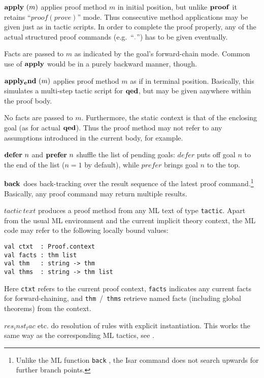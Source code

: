 \begin{descr}
\item [${\mathord{\mathbf{apply}}}~(m)$] applies proof method $m$ in initial
  position, but unlike ${\mathord{\mathbf{proof}}}$ it retains ``$proof(prove)$'' mode.  Thus
  consecutive method applications may be given just as in tactic scripts.  In
  order to complete the proof properly, any of the actual structured proof
  commands (e.g.\ ``${\mathord{\mathbf{.}}}$'') has to be given eventually.
  
  Facts are passed to $m$ as indicated by the goal's forward-chain mode.
  Common use of ${\mathord{\mathbf{apply}}}$ would be in a purely backward manner,
  though.
\item [${\mathord{\mathbf{apply_end}}}~(m)$] applies proof method $m$ as if in
  terminal position.  Basically, this simulates a multi-step tactic script for
  ${\mathord{\mathbf{qed}}}$, but may be given anywhere within the proof body.
  
  No facts are passed to $m$.  Furthermore, the static context is that of the
  enclosing goal (as for actual ${\mathord{\mathbf{qed}}}$).  Thus the proof method may not
  refer to any assumptions introduced in the current body, for example.
\item [${\mathord{\mathbf{defer}}}~n$ and ${\mathord{\mathbf{prefer}}}~n$] shuffle the list
  of pending goals: $defer$ puts off goal $n$ to the end of the list ($n = 1$
  by default), while $prefer$ brings goal $n$ to the top.
\item [${\mathord{\mathbf{back}}}$] does back-tracking over the result sequence of
  the latest proof command.\footnote{Unlike the ML function \texttt{back}
    \cite{isabelle-ref}, the Isar command does not search upwards for further
    branch points.} Basically, any proof command may return multiple results.
\item [$tactic~text$] produces a proof method from any ML text of type
  \texttt{tactic}.  Apart from the usual ML environment and the current
  implicit theory context, the ML code may refer to the following locally
  bound values:
{\footnotesize\begin{verbatim}
val ctxt  : Proof.context
val facts : thm list
val thm   : string -> thm
val thms  : string -> thm list
\end{verbatim}}
  Here \texttt{ctxt} refers to the current proof context, \texttt{facts}
  indicates any current facts for forward-chaining, and
  \texttt{thm}~/~\texttt{thms} retrieve named facts (including global
  theorems) from the context.
\item [$res_inst_tac$ etc.] do resolution of rules with explicit
  instantiation.  This works the same way as the corresponding ML tactics, see
  \cite[\S3]{isabelle-ref}.
  

\end{descr}
